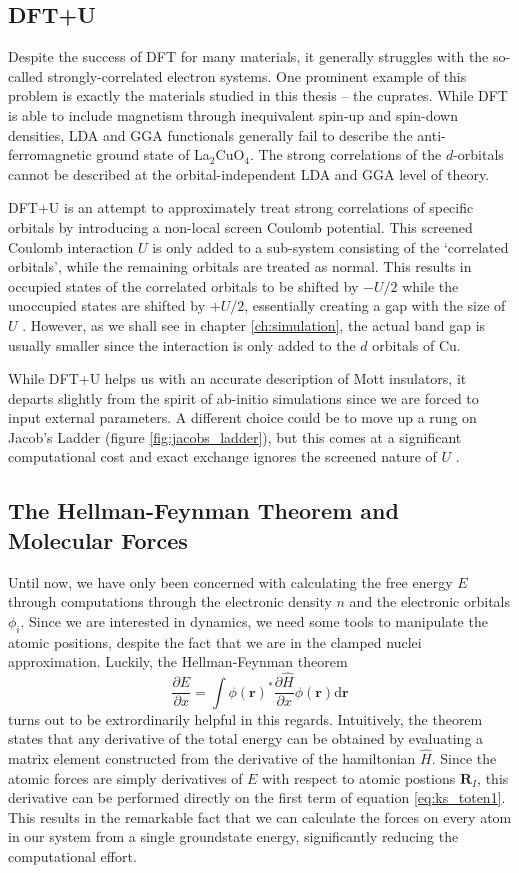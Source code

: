 \subsection{DFT+U}\label{sec:ldau}
Despite the success of DFT for many materials, it generally struggles with the so-called strongly-correlated electron systems. One prominent example of this problem is exactly the materials studied in this thesis -- the cuprates. While DFT is able to include magnetism through inequivalent spin-up and spin-down densities, LDA and GGA functionals generally fail to describe the anti-ferromagnetic ground state of La$_2$CuO$_4$. The strong correlations of the $d$-orbitals cannot be described at the orbital-independent LDA and GGA level of theory.

DFT+U is an attempt to approximately treat strong correlations of specific orbitals by introducing a non-local screen Coulomb potential. This screened Coulomb interaction $U$ is only added to a sub-system consisting of the `correlated orbitals', while the remaining orbitals are treated as normal. This results in occupied states of the correlated orbitals to be shifted by $-U/2$ while the unoccupied states are shifted by $+U/2$, essentially creating a gap with the size of $U$ \cite{Anisimov1997}. However, as we shall see in chapter \ref{ch:simulation}, the actual band gap is usually smaller since the interaction is only added to the $d$ orbitals of Cu.

While DFT+U helps us with an accurate description of Mott insulators, it departs slightly from the spirit of ab-initio simulations since we are forced to input external parameters. A different choice could be to move up a rung on Jacob's Ladder (figure \ref{fig:jacobs_ladder}), but this comes at a significant computational cost and exact exchange ignores the screened nature of $U$ \cite{Anisimov1997}.

\subsection{The Hellman-Feynman Theorem and Molecular Forces}
Until now, we have only been concerned with calculating the free energy $E$ through computations through the electronic density $n$ and the electronic orbitals $\phi_i$. Since we are interested in dynamics, we need some tools to manipulate the atomic positions, despite the fact that we are in the clamped nuclei approximation. Luckily, the Hellman-Feynman theorem \cite{Feynman1939}
%
\[ \frac{\partial E}{\partial x} = \int \phi(\bm{r})^* \frac{\partial \hat{H}}{\partial x} \phi(\bm{r}) \mathrm{d}\bm{r} \]
%
turns out to be extrordinarily helpful in this regards. Intuitively, the theorem states that any derivative of the total energy can be obtained by evaluating a matrix element constructed from the derivative of the hamiltonian $\hat{H}$. Since the atomic forces are simply derivatives of $E$ with respect to atomic postions $\bm{R}_I$, this derivative can be performed directly on the first term of equation \eqref{eq:ks_toten1}. This results in the remarkable fact that we can calculate the forces on every atom in our system from a single groundstate energy, significantly reducing the computational effort.

